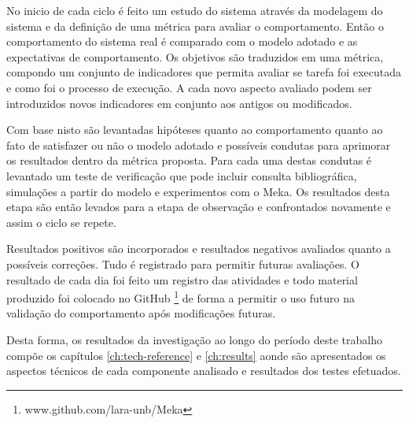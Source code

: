 No inicio de cada ciclo é feito um estudo do sistema através da modelagem do sistema e da definição de uma métrica para avaliar o comportamento. Então o comportamento do sistema real é comparado com o modelo adotado e as expectativas de comportamento. Os objetivos são traduzidos em uma métrica, compondo um conjunto de indicadores que permita avaliar se tarefa foi executada e como foi o processo de execução. A cada novo aspecto avaliado podem ser introduzidos novos indicadores em conjunto aos antigos ou modificados. 

Com base nisto são levantadas hipóteses quanto ao comportamento quanto ao fato de satisfazer ou não o modelo adotado e possíveis condutas para aprimorar os resultados dentro da métrica proposta. Para cada uma destas condutas é levantado um teste de verificação que pode incluir consulta bibliográfica, simulações a partir do modelo e experimentos com o Meka. Os resultados desta etapa são então levados para a etapa de observação e confrontados novamente e assim o ciclo se repete.

Resultados positivos são incorporados e resultados negativos avaliados quanto a possíveis correções. Tudo é registrado para permitir futuras avaliações. O resultado de cada dia foi feito um registro das atividades e todo material produzido foi colocado no GitHub \footnote{www.github.com/lara-unb/Meka} de forma a permitir o uso futuro na validação do comportamento após modificações futuras.

Desta forma, os resultados da investigação ao longo do período deste trabalho compõe os capítulos \ref{ch:tech-reference} e \ref{ch:results} aonde são apresentados os aspectos técnicos de cada componente analisado e resultados dos testes efetuados. 
